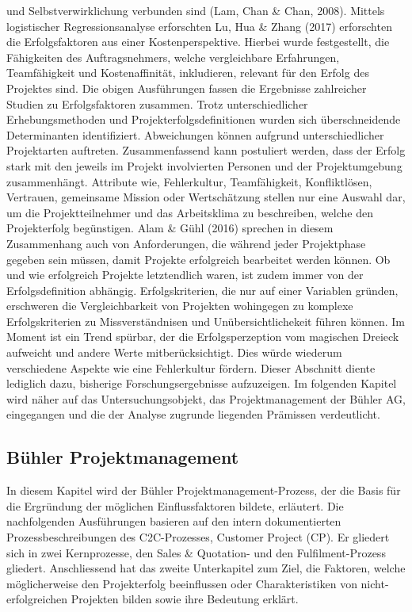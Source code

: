 und Selbstverwirklichung verbunden sind (Lam, Chan \& Chan, 2008). Mittels logistischer Regressionsanalyse erforschten Lu, Hua \& Zhang (2017) erforschten die Erfolgsfaktoren aus einer Kostenperspektive. Hierbei wurde festgestellt, die Fähigkeiten des Auftragsnehmers, welche vergleichbare Erfahrungen, Teamfähigkeit und Kostenaffinität, inkludieren, relevant für den Erfolg des Projektes sind. Die obigen Ausführungen fassen die Ergebnisse zahlreicher Studien zu Erfolgsfaktoren zusammen. Trotz unterschiedlicher Erhebungsmethoden und Projekterfolgsdefinitionen wurden sich überschneidende Determinanten identifiziert. Abweichungen können aufgrund unterschiedlicher Projektarten auftreten. Zusammenfassend kann postuliert werden, dass der Erfolg stark mit den jeweils im Projekt involvierten Personen und der Projektumgebung zusammenhängt. Attribute wie, Fehlerkultur, Teamfähigkeit, Konfliktlösen, Vertrauen, gemeinsame Mission oder Wertschätzung stellen nur eine Auswahl dar, um die Projektteilnehmer und das Arbeitsklima zu beschreiben, welche den Projekterfolg begünstigen. Alam \& Gühl (2016) sprechen in diesem Zusammenhang auch von Anforderungen, die während jeder Projektphase gegeben sein müssen, damit Projekte erfolgreich bearbeitet werden können. Ob und wie erfolgreich Projekte letztendlich waren, ist zudem immer von der Erfolgsdefinition abhängig. Erfolgskriterien, die nur auf einer Variablen gründen, erschweren die Vergleichbarkeit von Projekten wohingegen zu komplexe Erfolgskriterien zu Missverständnisen und Unübersichtlichekeit führen können. Im Moment ist ein Trend spürbar, der die Erfolgsperzeption vom magischen Dreieck aufweicht und andere Werte mitberücksichtigt. Dies würde wiederum verschiedene Aspekte wie eine Fehlerkultur fördern. Dieser Abschnitt diente lediglich dazu, bisherige Forschungsergebnisse aufzuzeigen. Im folgenden Kapitel wird näher auf das Untersuchungsobjekt, das Projektmanagement der Bühler AG, eingegangen und die der Analyse zugrunde liegenden Prämissen verdeutlicht.
\subsection{Bühler Projektmanagement}
In diesem Kapitel wird der Bühler Projektmanagement-Prozess, der die Basis für die Ergründung der möglichen Einflussfaktoren bildete, erläutert. Die nachfolgenden Ausführungen basieren auf den intern dokumentierten Prozessbeschreibungen des C2C-Prozesses, Customer Project (CP). Er gliedert sich in zwei Kernprozesse, den Sales \& Quotation- und den Fulfilment-Prozess gliedert. Anschliessend hat das zweite Unterkapitel zum Ziel, die Faktoren, welche möglicherweise den Projekterfolg beeinflussen oder Charakteristiken von nicht-erfolgreichen Projekten bilden sowie ihre Bedeutung erklärt.

